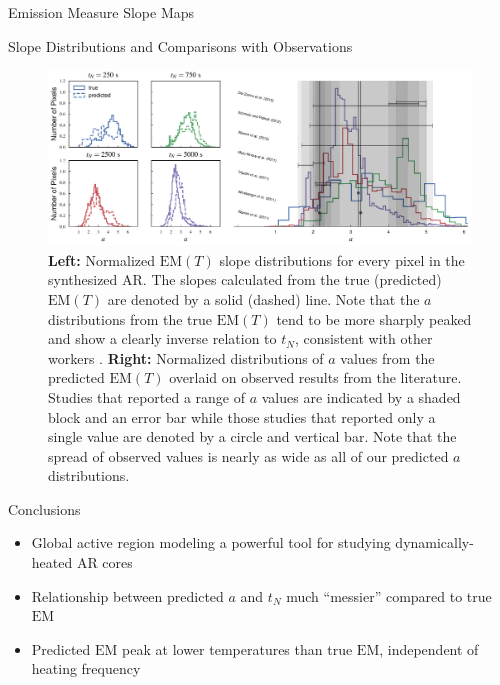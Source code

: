 \documentclass[final]{beamer}
\begin{document}
\begin{frame}
\begin{columns}[T]
\begin{column}{0.49\linewidth}
\begin{block}{Emission Measure Slope Maps}
\begin{figure}
        \label{fig:em_slope_maps}
      \end{figure}
    \end{block}
    \begin{block}{Slope Distributions and Comparisons with Observations}
      \begin{figure}
        \includegraphics[width=\columnwidth]{figures/slope_distributions.pdf}
        \caption{\textbf{Left:} Normalized $\mathrm{EM}(T)$ slope distributions for every pixel in the synthesized AR. The slopes calculated from the true (predicted) $\mathrm{EM}(T)$ are denoted by a solid (dashed) line. Note that the $a$ distributions from the true $\mathrm{EM}(T)$ tend to be more sharply peaked and show a clearly inverse relation to $t_N$, consistent with other workers \citep[e.g.][]{cargill_active_2014}. \textbf{Right:} Normalized distributions of $a$ values from the predicted $\mathrm{EM}(T)$ overlaid on observed results from the literature. Studies that reported a range of $a$ values are indicated by a shaded block and an error bar while those studies that reported only a single value are denoted by a circle and vertical bar. Note that the spread of observed values is nearly as wide as all of our predicted $a$ distributions.}
        \label{fig:slope_dist}
      \end{figure}
    \end{block}
    \begin{block}{Conclusions}
      \begin{itemize}
        \item Global active region modeling a powerful tool for studying dynamically-heated AR cores
        \item Relationship between predicted $a$ and $t_N$ \alert{much ``messier'' compared to true $\mathrm{EM}$}
        \item Predicted $\mathrm{EM}$ peak at lower temperatures than true $\mathrm{EM}$, independent of heating frequency

\end{itemize}
\end{block}
\end{column}
\end{columns}
\end{frame}
\end{document}
